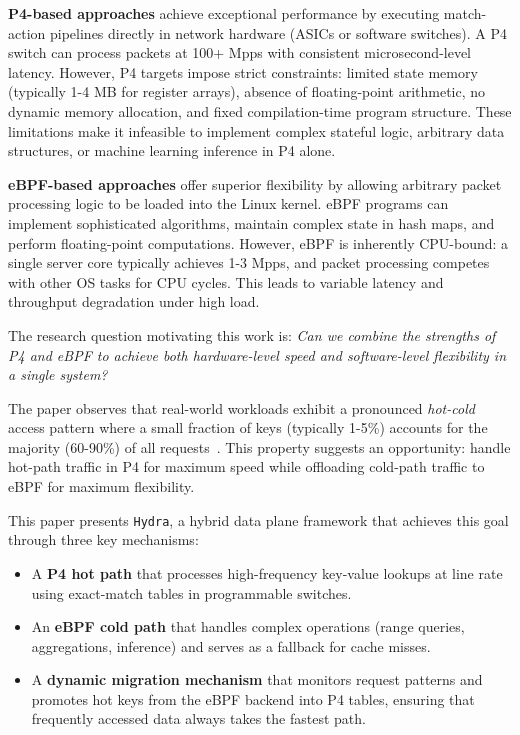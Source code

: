 \documentclass[sigconf,anonymous,10pt]{acmart}
\newcommand{\hydra}{\texttt{Hydra}}
\begin{document}
\textbf{P4-based approaches} achieve exceptional performance by executing match-action pipelines directly in network hardware (ASICs or software switches). A P4 switch can process packets at 100+ Mpps with consistent microsecond-level latency. However, P4 targets impose strict constraints: limited state memory (typically 1-4 MB for register arrays), absence of floating-point arithmetic, no dynamic memory allocation, and fixed compilation-time program structure. These limitations make it infeasible to implement complex stateful logic, arbitrary data structures, or machine learning inference in P4 alone.

\textbf{eBPF-based approaches} offer superior flexibility by allowing arbitrary packet processing logic to be loaded into the Linux kernel. eBPF programs can implement sophisticated algorithms, maintain complex state in hash maps, and perform floating-point computations. However, eBPF is inherently CPU-bound: a single server core typically achieves 1-3 Mpps, and packet processing competes with other OS tasks for CPU cycles. This leads to variable latency and throughput degradation under high load.

The research question motivating this work is: \textit{Can we combine the strengths of P4 and eBPF to achieve both hardware-level speed and software-level flexibility in a single system?} 

The paper observes that real-world workloads exhibit a pronounced \emph{hot-cold} access pattern where a small fraction of keys (typically 1-5\%) accounts for the majority (60-90\%) of all requests~\cite{zipf,hot-cold}. This property suggests an opportunity: handle hot-path traffic in P4 for maximum speed while offloading cold-path traffic to eBPF for maximum flexibility.

This paper presents \hydra{}, a hybrid data plane framework that achieves this goal through three key mechanisms:

\begin{itemize}
    \item A \textbf{P4 hot path} that processes high-frequency key-value lookups at line rate using exact-match tables in programmable switches.
    \item An \textbf{eBPF cold path} that handles complex operations (range queries, aggregations, inference) and serves as a fallback for cache misses.
    \item A \textbf{dynamic migration mechanism} that monitors request patterns and promotes hot keys from the eBPF backend into P4 tables, ensuring that frequently accessed data always takes the fastest path.
\end{itemize}
\end{document}

